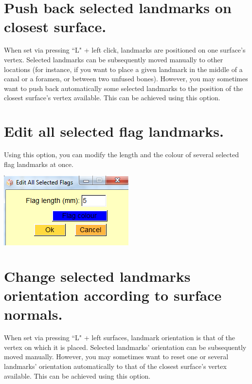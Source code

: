 \section{Push back selected landmarks on closest surface.}
When set via pressing ``L" + left click, landmarks are positioned on one surface's vertex. Selected
landmarks can be subsequently moved manually to other locations (for instance, if you want to place
a given landmark in the middle of a canal or a foramen, or between two unfused bones). However,
you may sometimes want to push back automatically some selected landmarks to the position of the
closest surface's vertex available. This can be achieved using this option.


\section{Edit all selected flag landmarks.}
\noindent
\begin{minipage}{0.5\textwidth}
Using this option, you can modify the length and the colour
of several selected flag landmarks at once.
\end{minipage}    
\begin{minipage}{0.5\textwidth}\centering
  \includegraphics[scale=0.5]{images/Edit_selected_landmarks/Edit_flags.png}
 \end{minipage} 
\noindent





\section{Change selected landmarks orientation according to surface normals.}
When set via pressing ``L" + left surfaces, landmark orientation is that of the vertex on which it is
placed. Selected landmarks' orientation can be subsequently moved manually. However, you may
sometimes want to reset one or several landmarks' orientation automatically to that of the closest
surface's vertex available. This can be achieved using this option.




